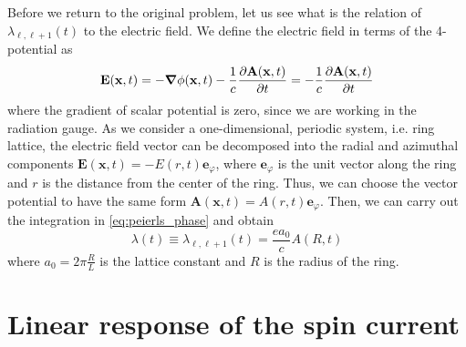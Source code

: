 Before we return to the original problem, let us see what is the relation of \(\lambda_{\ell,\ell+1}(t)\)  to the electric field.
We define the electric field in terms of the 4-potential as
\begin{equation}
    \mathbf{E}(\mathbf{x},t) = -\grad{\phi(\mathbf{x},t)} - \frac{1}{c} \pdv{\mathbf{A}(\mathbf{x},t)}{t}
    = -\frac{1}{c} \pdv{\mathbf{A} (\mathbf{x},t)}{t}
\end{equation}
where the gradient of scalar potential is zero, since we are working in the radiation gauge.
As we consider a one-dimensional, periodic system, i.e. ring lattice, the electric field vector can be decomposed into
the radial and azimuthal components \(\mathbf{E} (\mathbf{x} ,t) = -E(r,t)\mathbf{e}_{\varphi}\), where
\(\mathbf{e}_{\varphi }\) is the unit vector along the ring and \(r\) is the distance from the center of the ring.
Thus, we can choose the vector potential to have the same form \(\mathbf{A}(\mathbf{x},t) = A(r,t)\mathbf{e}_{\varphi}\).
Then, we can carry out the integration in \eqref{eq:peierls_phase} and obtain
\begin{equation}
    \lambda(t) \equiv \lambda_{\ell,\ell+1}(t) = \frac{e a_0}{c} A(R,t)
\end{equation}
where \(a_0 = 2\pi \frac{R}{L}\) is the lattice constant and \(R\) is the radius of the ring.

\section{Linear response of the spin current}

